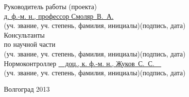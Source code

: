\begin{titlepage}
\begin{flushleft}
Руководитель работы (проекта)\\
\underline{д. ф.-м. н., профессор Смоляр~В.~А.}\hfill\underline{\hspace{5cm}}\\
\vspace{-.2cm}\hspace{.4cm}\footnotesize(уч. звание, уч. степень, фамилия, инициалы)\hspace{6.5cm}(подпись, дата)\normalsize\\
Консультанты\\
по научной части \underline{\hspace{7cm}}\hfill\underline{\hspace{5cm}}\\
\vspace{-.2cm}\hspace{4cm}\footnotesize(уч. звание, уч. степень, фамилия, инициалы)\hspace{3cm}(подпись, дата)\normalsize\\
Нормоконтроллер \underline{\ \ доц., к. ф.-м. н., Жуков~С.~С.\ \ }\hfill\underline{\hspace{5cm}}\\
\vspace{-.2cm}\hspace{4cm}\footnotesize(уч. звание, уч. степень, фамилия, инициалы)\hspace{3cm}(подпись, дата)\normalsize\\
\end{flushleft}

\vspace{\fill}

\begin{center}
Волгоград 2013
\end{center}

\end{titlepage}
